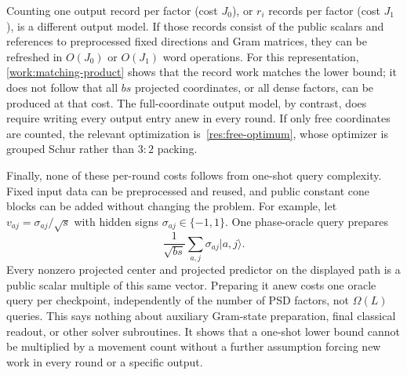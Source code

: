 Counting one output record per factor (cost $J_0$), or $r_i$ records
per factor (cost $J_1$), is a different output model. If those records consist of the
public scalars and references to preprocessed fixed directions and Gram
matrices, they can be refreshed in $O(J_0)$ or $O(J_1)$ word operations.
For this representation, \eqref{work:matching-product} shows that the
record work matches the lower bound; it does not follow that all $bs$
projected coordinates, or all dense factors, can be produced at that
cost. The full-coordinate output model, by contrast, does require writing
every output entry anew in every round. If only free coordinates are
counted, the relevant optimization is~\eqref{res:free-optimum}, whose
optimizer is grouped Schur rather than $3:2$ packing.

Finally, none of these per-round costs follows from one-shot query
complexity. Fixed input data can be preprocessed and reused, and public
constant cone blocks can be added without changing the problem. For
example, let $v_{aj}=\sigma_{aj}/\sqrt s$ with hidden signs
$\sigma_{aj}\in\{-1,1\}$. One phase-oracle query prepares
\[
 \frac1{\sqrt{bs}}\sum_{a,j}\sigma_{aj}|a,j\rangle.
\]
Every nonzero projected center and projected predictor on the displayed
path is a public scalar multiple of this same vector. Preparing it anew
costs one oracle query per checkpoint, independently of the number of PSD
factors, not $\Omega(L)$ queries. This says
nothing about auxiliary Gram-state preparation, final
classical readout, or other solver subroutines. It shows that a one-shot
lower bound cannot be multiplied by a movement count without a further
assumption forcing new work in every round or a specific output.
